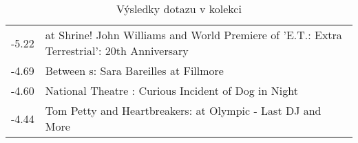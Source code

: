 \begin{table}[H]
\begin{tt}
\begin{minipage}[t]{.5\textwidth}
\begin{tabulary}{1.1\textwidth}{LL}
-5.22 &  at  Shrine! John Williams and  World Premiere of 'E.T.:  Extra Terrestrial':  20th Anniversary \\
-4.69 & Between  s: Sara Bareilles  at  Fillmore \\
-4.60 & National Theatre :  Curious Incident of  Dog in  Night \\
-4.44 & Tom Petty and  Heartbreakers:  at  Olympic -  Last DJ and More \\
\end{tabulary}
\end{minipage}

\horizlina
\end{tt}

\caption{Výsledky dotazu  v kolekci }
\label{tab:result:the_live}
\end{table}

